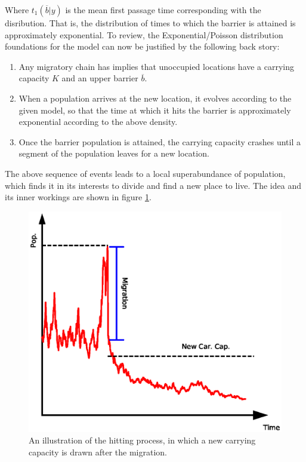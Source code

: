 \documentclass[11pt]{article}
\begin{document}
Where $t_1(\overline{b}|y) $ is the mean first passage time corresponding with the disribution. That is, the distribution of times to which the barrier is attained is approximately exponential. To review, the Exponential/Poisson distribution foundations for the model can now be justified by the following back story:
\begin{enumerate}
\item Any migratory chain has implies that unoccupied locations have a carrying capacity $K$ and an upper barrier $\overline{b}$.  

\item When a population arrives at the new location, it evolves according to the given model, so that the time at which it hits the barrier is approximately exponential according to the above density.  
\item Once the barrier population is attained, the carrying capacity crashes until a segment of the population leaves for a new location.
\end{enumerate}

The above sequence of events leads to a local superabundance of population, which finds it in its interests to divide and find a new place to live. The idea and its inner workings are shown in figure \ref{evo0}.

\begin{figure}
\begin{center}
\includegraphics[width=\textwidth]{AncillaryFiles//figure25.eps}
\caption{An illustration of the hitting process, in which a new carrying capacity is drawn after the migration. } \label{evo0}
\end{center} 
\end{figure}
\end{document}
